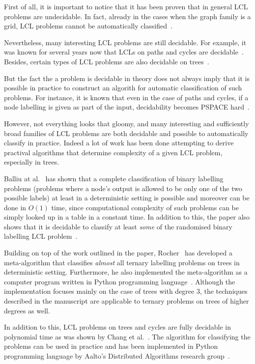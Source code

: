 First of all, it is important to notice that it has been
proven that in general LCL problems are undecidable.
In fact, already in the cases when the graph family is a grid,
LCL problems cannot be automatically classified~\cite{Brandt2017, Naor1993}.

Nevertheless, many interesting LCL problems are still decidable.
For example, it was known for several years now that LCLs
on paths and cycles are decidable~\cite{Balliu2018, Brandt2017, Naor1993}.
Besides, certain types of LCL problems are also decidable on
trees~\cite{Chang2017}.

But the fact the a problem is decidable in theory does not
always imply that it is possible in practice to
construct an algorith for automatic classification of
such problems. For instance, it is known that even in
the case of paths and cycles, if a node labelling is
given as part of the input, decidability becomes
PSPACE hard~\cite{Balliu2018}.

However, not everything looks that gloomy, and many
interesting and sufficiently broad families of LCL
problems are both decidable and possible to
automatically classify in practice. Indeed a lot of work
has been done attempting to derive practival algorithms
that determine complexity of a given LCL problem,
especially in trees.

Balliu at al.~\cite{Balliu2019c} has shown that a complete classification
of binary labelling problems (problems where a node's
output is allowed to be only one of the two possible labels)
at least in a deterministic setting is possible and moreover
can be done in $O(1)$ time, since computational
complexity of such problems can be simply looked up in a
table in a constant time. In addition
to this, the paper also shows that it is decidable to
classify at least \emph{some} of the randomised binary labelling
LCL problem~\cite{Balliu2019c}.

Building on top of the work outlined in the paper, Rocher~\cite{Rocher2020clas}
has developed a meta-algorithm that classifies \emph{almost}
all ternary labelling problems on trees in deterministic
setting. Furthermore,
he also implemented the meta-algorithm as a
computer program written in Python programming language~\cite{Rocher2020doc}.
Although the implementation focuses mainly on the case of trees with degree 3,
the techniques described in the manuscript are applicable to ternary problems
on trees of higher degrees as well.

In addition to this, LCL problems on trees and cycles
are fully decidable in polynomial time as was shown by Chang et al.~\cite{Chang2020}.
The algorithm for classifying the problems can be used in practice and has
been implemented in Python programming language by Aalto's
Distributed Algorithms research group~\cite{Tereshchenko2020}.

